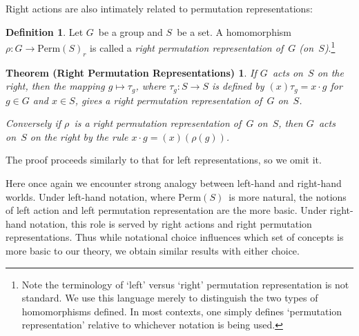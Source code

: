 \documentclass[letterpaper]{article}
\theoremstyle{definition}
\newtheorem*{defn}{Definition}
\theoremstyle{plain}
\newtheorem*{RPR}{Theorem (Right Permutation Representations)}
\newcommand{\perm}[1]{\mathrm{Perm}({#1})}
\begin{document}
Right actions are also intimately related to permutation representations:
\goodbreak
\begin{defn}
Let $G$~be a group and $S$~be a set. A homomorphism $\rho:G\to\perm{S}_r$ is called a \emph{right permutation representation of~$G$ (on~$S$)}.\footnote{Note the terminology of `left' versus `right' permutation representation is not standard. We use this language merely to distinguish the two types of homomorphisms defined. In most contexts, one simply defines `permutation representation' relative to whichever notation is being used.}
\end{defn}
\begin{RPR}
If $G$~acts on~$S$ on the right, then the mapping $g\mapsto\tau_g$, where $\tau_g:S\to S$ is defined by $(x)\tau_g=x\cdot g$ for $g\in G$ and $x\in S$, gives a right permutation representation of~$G$ on~$S$.

Conversely if $\rho$~is a right permutation representation of~$G$ on~$S$, then $G$~acts on~$S$ on the right by the rule $x\cdot g=(x)(\rho(g))$.
\end{RPR}
\noindent The proof proceeds similarly to that for left representations, so we omit it.

Here once again we encounter strong analogy between left-hand and right-hand worlds. Under left-hand notation, where $\perm{S}$~is more natural, the notions of left action and left permutation representation are the more basic. Under right-hand notation, this role is served by right actions and right permutation representations. Thus while notational choice influences which set of concepts is more basic to our theory, we obtain similar results with either choice.
\end{document}
